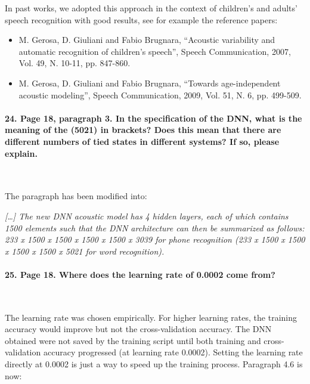\documentclass[]{article}
\begin{document}
In past works, we  adopted this approach  in the context  of children's
and adults' speech recognition  with good results,  see for example  the reference
papers:

\begin{itemize}
\item M. Gerosa, D. Giuliani  and Fabio Brugnara, ``Acoustic variability and
automatic recognition of children’s speech'', Speech Communication,
2007, Vol. 49, N. 10-11, pp. 847-860.
\item M. Gerosa, D. Giuliani and Fabio Brugnara, ``Towards age-independent acoustic modeling'',
Speech Communication, 2009, Vol. 51, N. 6, pp. 499-509.
\end{itemize}


\paragraph{24. Page 18, paragraph 3. In the specification of the DNN, what is the meaning of the (5021) in brackets? Does this mean that there are different numbers of tied states in different systems? If so, please explain.}

~

The paragraph has been modified into:

\textit{[\dots] The new DNN acoustic model  has 4 hidden layers,
each of  which contains 1500  elements such that the  DNN architecture
can then be summarized  as follows: 233 x 1500 x 1500  x 1500 x 1500 x
3039 for phone recognition (233 x 1500 x 1500  x 1500 x 1500 x 5021 for word recognition).}

\paragraph{25. Page 18. Where does the learning rate of 0.0002 come from?}

~

The learning rate was chosen empirically. For higher learning rates, the training accuracy would improve but not the cross-validation accuracy. The DNN obtained were not saved by the training script until both training and cross-validation accuracy progressed (at learning rate 0.0002). Setting the learning rate directly at 0.0002 is just a way to speed up the training process. Paragraph 4.6 is now:
\end{document}
